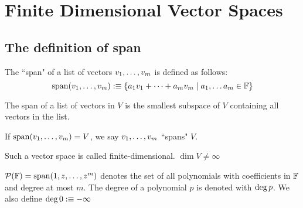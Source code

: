 \chapter{Finite Dimensional Vector Spaces}
\section{The definition of span}
\setcounter{thm}{4}
\begin{mydef} The ``span" of a list of vectors $v_1, \dots, v_m$ is defined as follows:
 \begin{equation}
     \operatorname{span} (v_1, \dots, v_m) :\equiv \{a_1 v_1 + \cdots + a_m v_m \mid a_1, \dots a_m \in \mathbb{F} \}
 \end{equation}   
\end{mydef}


\begin{thm}
    The  span of a list of vectors in $V$ is the smallest subspace of $V$ containing all vectors in the list.
\end{thm}

\begin{thm}
    If $\operatorname{span} (v_1, \dots, v_m) = V$, we say $v_1, \dots, v_m$ ``spans" $V$.    
\end{thm}

\setcounter{thm}{8}
\begin{thm}
    Such a vector space is called finite-dimensional. $\dim V \neq \infty$
\end{thm}

\begin{thm}
    $\mathcal{P} (\mathbb{F} )=\operatorname{span} (1,z,\dots,z^m)$ denotes the set of all polynomials with coefficients in ${\mathbb{F}}$ and degree at most $m$. The degree of a polynomial $p$ is denoted with ${\operatorname{deg} \,} p$. We also define ${\operatorname{deg} \,} 0 : \equiv -\infty$
\end{thm}


